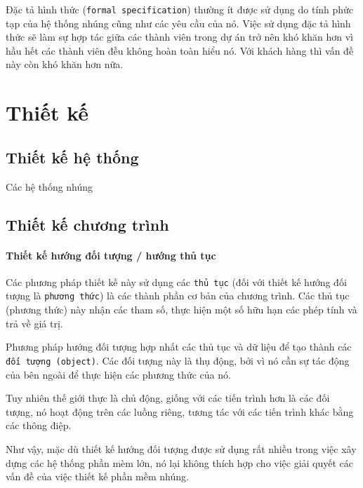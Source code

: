         Đặc tả hình thức (\texttt{formal specification}) thường ít được sử
        dụng do tính phức tạp của hệ thống nhúng cũng như các yêu cầu của nó.
        Việc sử dụng đặc tả hình thức sẽ làm sự hợp tác giữa các thành viên
        trong dự án trở nên khó khăn hơn vì hầu hết các thành viên đều không
        hoàn toàn hiểu nó. Với khách hàng thì vấn đề này còn khó khăn hơn nữa.

    \section{Thiết kế}
        \subsection{Thiết kế hệ thống}
            Các hệ thống nhúng 

        \subsection{Thiết kế chương trình}
            \paragraph{Thiết kế hướng đối tượng / hướng thủ tục}
                Các phương pháp thiết kế này sử dụng các \texttt{thủ tục} (đối với
                thiết kế hướng đối tượng là \texttt{phương thức}) là các thành
                phần cơ bản của chương trình. Các thủ tục (phương thức) này
                nhận các tham số, thực hiện một số hữu hạn các phép tính và trả
                về giá trị.

                Phương pháp hướng đối tượng hợp nhất các thủ tục và dữ liệu để
                tạo thành các \texttt{đối tượng (object)}. Các đối tượng này là
                thụ động, bởi vì nó cần sự tác động của bên ngoài để thực hiện
                các phương thức của nó.

                Tuy nhiên thế giới thực là chủ động, giống với các tiến trình
                hơn là các đối tượng, nó hoạt động trên các luồng riêng, tương
                tác với các tiến trình khác bằng các thông điệp. 

                Như vậy, mặc dù thiết kế hướng đối tượng được sử dụng rất nhiều
                trong việc xây dựng các hệ thống phần mèm lớn, nó lại không
                thích hợp cho việc giải quyết các vấn đề của việc thiết kế phần
                mềm nhúng.

